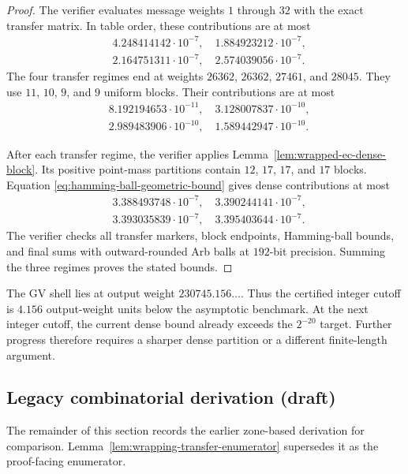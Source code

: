 \begin{proof}
The verifier evaluates message weights $1$ through $32$ with the exact
transfer matrix.  In table order, these contributions are at most
\[
\begin{split}
 &4.248414142\mathbin{\cdot}10^{-7},\quad
  1.884923212\mathbin{\cdot}10^{-7},\\
 &2.164751311\mathbin{\cdot}10^{-7},\quad
  2.574039056\mathbin{\cdot}10^{-7}.
\end{split}
\]
The four transfer regimes end at weights $26362$, $26362$, $27461$, and
$28045$.  They use $11$, $10$, $9$, and $9$ uniform blocks.  Their
contributions are at most
\[
\begin{split}
 &8.192194653\mathbin{\cdot}10^{-11},\quad
  3.128007837\mathbin{\cdot}10^{-10},\\
 &2.989483906\mathbin{\cdot}10^{-10},\quad
  1.589442947\mathbin{\cdot}10^{-10}.
\end{split}
\]

After each transfer regime, the verifier applies
Lemma~\ref{lem:wrapped-ec-dense-block}.  Its positive point-mass partitions
contain $12$, $17$, $17$, and $17$ blocks.  Equation
\eqref{eq:hamming-ball-geometric-bound} gives dense contributions at most
\[
\begin{split}
 &3.388493748\mathbin{\cdot}10^{-7},\quad
  3.390244141\mathbin{\cdot}10^{-7},\\
 &3.393035839\mathbin{\cdot}10^{-7},\quad
  3.395403644\mathbin{\cdot}10^{-7}.
\end{split}
\]
The verifier checks all transfer markers, block endpoints, Hamming-ball
bounds, and final sums with outward-rounded Arb balls at $192$-bit precision.
Summing the three regimes proves the stated bounds.
\end{proof}

The GV shell lies at output weight $230745.156\ldots$.  Thus the certified
integer cutoff is $4.156$ output-weight units below the asymptotic benchmark.
At the next integer cutoff, the current dense bound already exceeds the
$2^{-20}$ target.  Further progress therefore requires a sharper dense
partition or a different finite-length argument.

\subsection{Legacy combinatorial derivation (draft)}

The remainder of this section records the earlier zone-based derivation for
comparison.  Lemma~\ref{lem:wrapping-transfer-enumerator} supersedes it as the
proof-facing enumerator.


